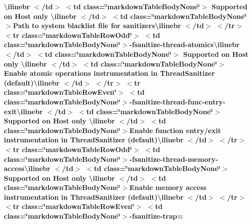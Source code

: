 \begin{longtabu}
{\bfseries{{\ttfamily \textbackslash{}ilinebr \texorpdfstring{$<$}{<}/td\texorpdfstring{$>$}{>} \texorpdfstring{$<$}{<}td class=\char`\"{}markdown\+Table\+Body\+None\char`\"{}\texorpdfstring{$>$}{>} Supported on Host only \textbackslash{}ilinebr \texorpdfstring{$<$}{<}/td\texorpdfstring{$>$}{>} \texorpdfstring{$<$}{<}td class=\char`\"{}markdown\+Table\+Body\+None\char`\"{}\texorpdfstring{$>$}{>}}Path to system blacklist file for sanitizers{\ttfamily \textbackslash{}ilinebr \texorpdfstring{$<$}{<}/td\texorpdfstring{$>$}{>} \texorpdfstring{$<$}{<}/tr\texorpdfstring{$>$}{>} \texorpdfstring{$<$}{<}tr class=\char`\"{}markdown\+Table\+Row\+Odd\char`\"{}\texorpdfstring{$>$}{>} \texorpdfstring{$<$}{<}td class=\char`\"{}markdown\+Table\+Body\+None\char`\"{}\texorpdfstring{$>$}{>}}-\/fsanitize-\/thread-\/atomics{\ttfamily \textbackslash{}ilinebr \texorpdfstring{$<$}{<}/td\texorpdfstring{$>$}{>} \texorpdfstring{$<$}{<}td class=\char`\"{}markdown\+Table\+Body\+None\char`\"{}\texorpdfstring{$>$}{>} Supported on Host only \textbackslash{}ilinebr \texorpdfstring{$<$}{<}/td\texorpdfstring{$>$}{>} \texorpdfstring{$<$}{<}td class=\char`\"{}markdown\+Table\+Body\+None\char`\"{}\texorpdfstring{$>$}{>}}Enable atomic operations instrumentation in Thread\+Sanitizer (default){\ttfamily \textbackslash{}ilinebr \texorpdfstring{$<$}{<}/td\texorpdfstring{$>$}{>} \texorpdfstring{$<$}{<}/tr\texorpdfstring{$>$}{>} \texorpdfstring{$<$}{<}tr class=\char`\"{}markdown\+Table\+Row\+Even\char`\"{}\texorpdfstring{$>$}{>} \texorpdfstring{$<$}{<}td class=\char`\"{}markdown\+Table\+Body\+None\char`\"{}\texorpdfstring{$>$}{>}}-\/fsanitize-\/thread-\/func-\/entry-\/exit{\ttfamily \textbackslash{}ilinebr \texorpdfstring{$<$}{<}/td\texorpdfstring{$>$}{>} \texorpdfstring{$<$}{<}td class=\char`\"{}markdown\+Table\+Body\+None\char`\"{}\texorpdfstring{$>$}{>} Supported on Host only \textbackslash{}ilinebr \texorpdfstring{$<$}{<}/td\texorpdfstring{$>$}{>} \texorpdfstring{$<$}{<}td class=\char`\"{}markdown\+Table\+Body\+None\char`\"{}\texorpdfstring{$>$}{>}}Enable function entry/exit instrumentation in Thread\+Sanitizer (default){\ttfamily \textbackslash{}ilinebr \texorpdfstring{$<$}{<}/td\texorpdfstring{$>$}{>} \texorpdfstring{$<$}{<}/tr\texorpdfstring{$>$}{>} \texorpdfstring{$<$}{<}tr class=\char`\"{}markdown\+Table\+Row\+Odd\char`\"{}\texorpdfstring{$>$}{>} \texorpdfstring{$<$}{<}td class=\char`\"{}markdown\+Table\+Body\+None\char`\"{}\texorpdfstring{$>$}{>}}-\/fsanitize-\/thread-\/memory-\/access{\ttfamily \textbackslash{}ilinebr \texorpdfstring{$<$}{<}/td\texorpdfstring{$>$}{>} \texorpdfstring{$<$}{<}td class=\char`\"{}markdown\+Table\+Body\+None\char`\"{}\texorpdfstring{$>$}{>} Supported on Host only \textbackslash{}ilinebr \texorpdfstring{$<$}{<}/td\texorpdfstring{$>$}{>} \texorpdfstring{$<$}{<}td class=\char`\"{}markdown\+Table\+Body\+None\char`\"{}\texorpdfstring{$>$}{>}}Enable memory access instrumentation in Thread\+Sanitizer (default){\ttfamily \textbackslash{}ilinebr \texorpdfstring{$<$}{<}/td\texorpdfstring{$>$}{>} \texorpdfstring{$<$}{<}/tr\texorpdfstring{$>$}{>} \texorpdfstring{$<$}{<}tr class=\char`\"{}markdown\+Table\+Row\+Even\char`\"{}\texorpdfstring{$>$}{>} \texorpdfstring{$<$}{<}td class=\char`\"{}markdown\+Table\+Body\+None\char`\"{}\texorpdfstring{$>$}{>}}-\/fsanitize-\/trap=}}


\end{longtabu}
